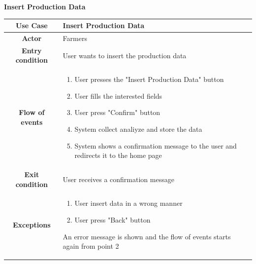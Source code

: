 \documentclass[table, 12pt]{article}
\begin{document}
\begin{itemize}
            \begin{table}[H]
                \item[] \textbf{Insert Production Data}
                \item[] 
                \centering
                \begin{tabular}{|c |m{}|}
                    \hline
                    \textbf{Use Case} & Insert Production Data\\ \hline
                    \textbf{Actor} & Farmers\\ \hline
                    \textbf{Entry condition} & User wants to insert the production data\\  \hline
                    \textbf{Flow of events} & \begin{enumerate}
                                                \item User presses the "Insert Production Data" button
                                                \item User fills the interested fields
                                                \item User press "Confirm" button
                                                \item System collect analiyze and store the data
                                                \item System shows a confirmation message to the user and redirects it to the home page
                                            \end{enumerate}\\ \hline
                    \textbf{Exit condition} & User receives a confirmation message\\ \hline
                    \textbf{Exceptions} &  \begin{enumerate}
                        \item User insert data in a wrong manner
                        \item User press "Back" button
                    \end{enumerate}
                    An error message is shown and the flow of events starts again from point 2\\ \hline                    
                \end{tabular}
            \end{table}
            

\end{itemize}
\end{document}
